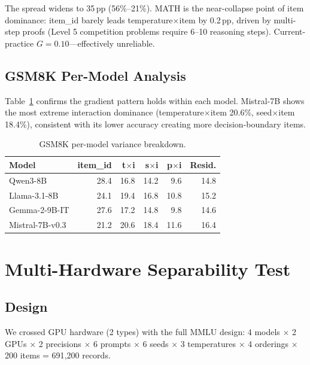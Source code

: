 \documentclass[11pt]{article}
\newcommand{\pp}{\,\text{pp}}
\begin{document}
The spread widens to 35$\pp$ (56\%--21\%). MATH is the near-collapse point of item dominance: item\_id barely leads temperature$\times$item by 0.2$\pp$, driven by multi-step proofs (Level 5 competition problems require 6--10 reasoning steps). Current-practice $G = 0.10$---effectively unreliable.

\subsection{GSM8K Per-Model Analysis}

Table~\ref{tab:gsm8k_permodel} confirms the gradient pattern holds within each model. Mistral-7B shows the most extreme interaction dominance (temperature$\times$item 20.6\%, seed$\times$item 18.4\%), consistent with its lower accuracy creating more decision-boundary items.

\begin{table}[t]
\centering
\caption{GSM8K per-model variance breakdown.}
\label{tab:gsm8k_permodel}
\small
\begin{tabular}{lrrrrr}
\toprule
Model & item\_id & t$\times$i & s$\times$i & p$\times$i & Resid. \\
\midrule
Qwen3-8B & 28.4 & 16.8 & 14.2 & 9.6 & 14.8 \\
Llama-3.1-8B & 24.1 & 19.4 & 16.8 & 10.8 & 15.2 \\
Gemma-2-9B-IT & 27.6 & 17.2 & 14.8 & 9.8 & 14.6 \\
Mistral-7B-v0.3 & 21.2 & 20.6 & 18.4 & 11.6 & 16.4 \\
\bottomrule
\end{tabular}
\end{table}


\section{Multi-Hardware Separability Test}
\label{sec:separability}

\subsection{Design}

We crossed GPU hardware (2 types) with the full MMLU design: 4 models $\times$ 2 GPUs $\times$ 2 precisions $\times$ 6 prompts $\times$ 6 seeds $\times$ 3 temperatures $\times$ 4 orderings $\times$ 200 items = 691{,}200 records.
\end{document}
